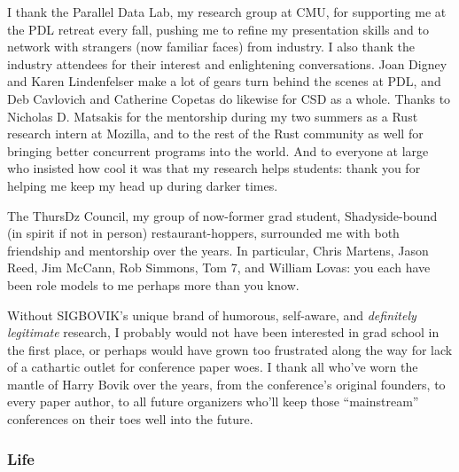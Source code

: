 \documentclass[12pt]{cmuthesis}
\begin{document}
\begin{acknowledgments}
{I thank the Parallel Data Lab, my research group at CMU,
for supporting me at the PDL retreat every fall,
pushing me to refine my presentation skills and to network with strangers (now familiar faces) from industry.
I also thank the industry attendees
for their interest %
and enlightening conversations.
Joan Digney and Karen Lindenfelser
make a lot of gears turn behind the scenes at PDL,
and Deb Cavlovich and Catherine Copetas
do likewise for CSD as a whole.
Thanks to Nicholas D. Matsakis for the mentorship %
during my two summers as a Rust research intern at Mozilla,
and to the rest of the Rust community as well for
bringing better concurrent programs into the world. %
And to everyone at large who
insisted how cool it was that my research helps students:
thank you for helping me keep my head up during darker times.

The ThursDz Council,
my group of now-former grad student, Shadyside-bound (in spirit if not in person) restaurant-hoppers,
surrounded me with both friendship and mentorship over the years.
In particular,
Chris Martens,
Jason Reed,
Jim McCann,
Rob Simmons,
Tom 7,
and
William Lovas:
you each have been role models to me
perhaps more than you know.

Without SIGBOVIK's unique brand of humorous, self-aware, and {\em definitely legitimate} research,
I probably would not have been interested in grad school in the first place,
or perhaps would have grown too frustrated along the way for lack of a cathartic outlet for conference paper woes.
I thank all who've worn the mantle of Harry Bovik over the years,
from the conference's original founders,
to every paper author,
to all future organizers who'll keep those ``mainstream'' conferences on their toes well into the future.

\subsubsection{Life}

}
\end{acknowledgments}
\end{document}
